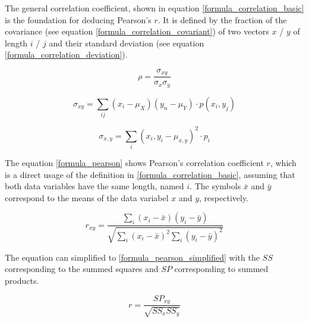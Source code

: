 \documentclass[a4paper,headsepline,footsepline,fontsize=11pt,BCOR=12mm,DIV=12]{report}
\begin{document}
The general correlation coefficient, shown in equation \ref{formula_correlation_basic} is the foundation for deducing Pearson's $r$. It is defined by the fraction of the covariance (see equation \ref{formula_correlation_covariant}) of two vectors $x$ / $y$ of length $i$ / $j$ and their standard deviation (see equation \ref{formula_correlation_deviation}).\cite{HerzSchlicherSiegener1992}

\smallskip

\begin{equation}
\label{formula_correlation_basic}
	\rho = \frac{\sigma_{xy}}{\sigma_{x}\sigma_{y}}
\end{equation}

\begin{equation}
\label{formula_correlation_covariant}
	\sigma_{xy} = \sum_{ij}(x_i-\mu_X)(y_n-\mu_Y) \cdot p(x_i,y_j)
\end{equation}

\begin{equation}
\label{formula_correlation_deviation}
	\sigma_{x,y} = \sum_{i}(x_i,y_i-\mu_{x,y})^2 \cdot p_i
\end{equation}

\bigskip

The equation \ref{formula_pearson} shows Pearson's correlation coefficient $r$, which is a direct usage of the definition in \ref{formula_correlation_basic}, assuming that both data variables have the same length, named $i$. The symbols $\bar{x}$ and $\bar{y}$ correspond to the means of the data variabel $x$ and $y$, respectively. \cite{BenestyChenHuang2009,Zychlinski2018}

\smallskip

\begin{equation}
\label{formula_pearson}	
	r_{xy} =  \frac{\sum_{i}{(x_i-\bar{x})(y_i-\bar{y})}}{\sqrt{\sum_{i}{(x_i-\bar{x})^2}\sum_{i}{(y_i-\bar{y})^2}}}
\end{equation}

\bigskip

The equation can simplified to \ref{formula_pearson_simplified} with the $SS$ corresponding to the summed squares and $SP$ corresponding to summed products.

\smallskip

\begin{equation}
\label{formula_pearson_simplified}
	r =  \frac{SP_{xy}}{\sqrt{SS_x SS_y}}
\end{equation}
\end{document}
